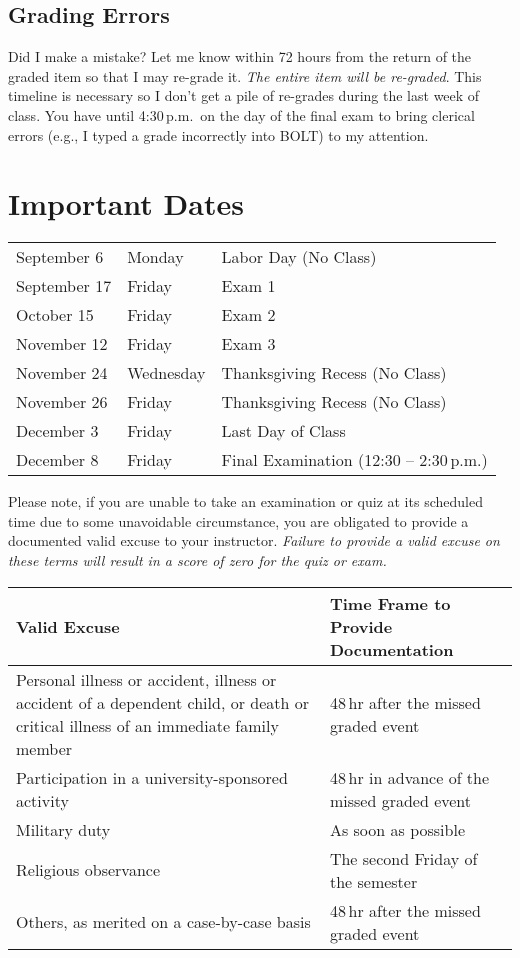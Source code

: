 \documentclass[11pt,letterpaper]{article}
\begin{document}
\subsection{Grading Errors}
Did I make a mistake? Let me know within 72 hours from the return of the graded
item so that I may re-grade it. \emph{The entire item will be re-graded}. This
timeline is necessary so I don't get a pile of re-grades during the last week of
class. You have until 4:30\,p.m.\ on the day of the final exam to bring clerical
errors (e.g., I typed a grade incorrectly into BOLT) to my attention.

\section{Important Dates}\label{importantdates}
\begin{center}
	\begin{tabular} {l l l}
		September 6  & Monday    & Labor Day (No Class) \\
		September 17 & Friday    & Exam 1 \\
		October 15   & Friday    & Exam 2 \\
		November 12  & Friday    & Exam 3 \\
		November 24  & Wednesday & Thanksgiving Recess (No Class) \\
		November 26  & Friday    & Thanksgiving Recess (No Class) \\
		December 3   & Friday    & Last Day of Class \\
		December 8   & Friday    & Final Examination (12:30 --
		2:30\,p.m.)
	\end{tabular}
\end{center}

Please note, if you are unable to take an examination or quiz at
its scheduled time due to some unavoidable circumstance, you are obligated to
provide a documented valid excuse to your instructor. \emph{Failure to provide a
valid excuse on these terms will result in a score of zero for the quiz or
exam.}

	\begin{center}
		\renewcommand\arraystretch{1.25}
\begin{tabularx}{\linewidth} {X X}
	\toprule
	\bfseries Valid Excuse & \bfseries Time Frame to Provide Documentation
	\\ \midrule
	Personal illness or accident, illness or accident of a dependent child,
	or death or critical illness of an immediate family member &
	48\,hr after the missed graded event \\
	Participation in a university-sponsored activity &
	48\,hr in advance of the missed graded event \\
	Military duty & As soon as possible \\
	Religious observance & The second Friday of the semester \\
	Others, as merited on a case-by-case basis & 48\,hr after the
	missed graded event \\
	\bottomrule
\end{tabularx}
\end{center}
\end{document}
